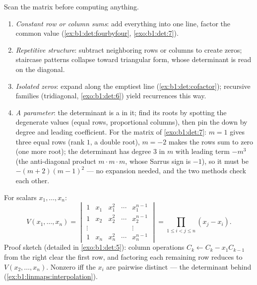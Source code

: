 \begin{method}
\label{met:b1:det:strategy}
Scan the matrix before computing anything.
\begin{enumerate}
  \item \emph{Constant row or column sums}: add everything into
        one line, factor the common value
        (\cref{ex:b1:det:fourbyfour}, \cref{exo:b1:det:7}).
  \item \emph{Repetitive structure}: subtract neighboring rows or
        columns to create zeros; staircase patterns collapse
        toward triangular form, whose determinant is read on the
        diagonal.
  \item \emph{Isolated zeros}: expand along the emptiest line
        (\cref{ex:b1:det:cofactor}); recursive families
        (tridiagonal, \cref{exo:b1:det:6}) yield recurrences this
        way.
  \item \emph{A parameter}: the determinant is a  in
        it; find its roots by spotting the degenerate values
        (equal rows, proportional columns), then pin the
         down by degree and leading coefficient. For
        the matrix of \cref{exo:b1:det:7}: $m = 1$ gives three
        equal rows (rank $1$, a double root), $m = -2$ makes the
        rows sum to zero (one more root); the determinant has
        degree $3$ in $m$ with leading term $-m^3$ (the
        anti-diagonal product $m\cdot m\cdot m$, whose Sarrus
        sign is $-1$), so it must be $-(m+2)(m-1)^2$ --- no
        expansion needed, and the two methods check each other.
\end{enumerate}
\end{method}

\begin{example}\label{ex:b1:det:vandermonde}
For scalars $x_1, \dots, x_n$:
\[
V(x_1, \dots, x_n) =
\begin{vmatrix}
1 & x_1 & x_1^2 & \cdots & x_1^{n-1}\\
1 & x_2 & x_2^2 & \cdots & x_2^{n-1}\\
\vdots & & & & \vdots\\
1 & x_n & x_n^2 & \cdots & x_n^{n-1}
\end{vmatrix}
= \prod_{1 \leq i < j \leq n} (x_j - x_i) .
\]
Proof sketch (detailed in \cref{exo:b1:det:5}): column operations
$C_k \leftarrow C_k - x_1 C_{k-1}$ from the right clear the first
row, and factoring each remaining row reduces to
$V(x_2, \dots, x_n)$. Nonzero iff the $x_i$ are pairwise distinct
--- the determinant behind 
(\cref{ex:b1:linmaps:interpolation}).
\end{example}

